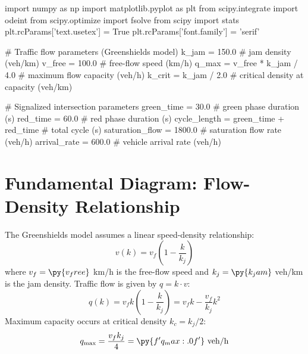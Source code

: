 \documentclass[11pt,a4paper]{article}
\begin{document}
\begin{pycode}

import numpy as np
import matplotlib.pyplot as plt
from scipy.integrate import odeint
from scipy.optimize import fsolve
from scipy import stats
plt.rcParams['text.usetex'] = True
plt.rcParams['font.family'] = 'serif'

# Traffic flow parameters (Greenshields model)
k_jam = 150.0  # jam density (veh/km)
v_free = 100.0  # free-flow speed (km/h)
q_max = v_free * k_jam / 4.0  # maximum flow capacity (veh/h)
k_crit = k_jam / 2.0  # critical density at capacity (veh/km)

# Signalized intersection parameters
green_time = 30.0  # green phase duration (s)
red_time = 60.0  # red phase duration (s)
cycle_length = green_time + red_time  # total cycle (s)
saturation_flow = 1800.0  # saturation flow rate (veh/h)
arrival_rate = 600.0  # vehicle arrival rate (veh/h)

\end{pycode}

\section{Fundamental Diagram: Flow-Density Relationship}

The Greenshields model assumes a linear speed-density relationship:
\begin{equation}
v(k) = v_f \left(1 - \frac{k}{k_j}\right)
\end{equation}
where $v_f = \py{v_free}$ km/h is the free-flow speed and $k_j = \py{k_jam}$ veh/km is the jam density. Traffic flow is given by $q = k \cdot v$:
\begin{equation}
q(k) = v_f k \left(1 - \frac{k}{k_j}\right) = v_f k - \frac{v_f}{k_j} k^2
\end{equation}
Maximum capacity occurs at critical density $k_c = k_j/2$:
\begin{equation}
q_{\text{max}} = \frac{v_f k_j}{4} = \py{f'{q_max:.0f}'} \text{ veh/h}
\end{equation}
\end{document}
